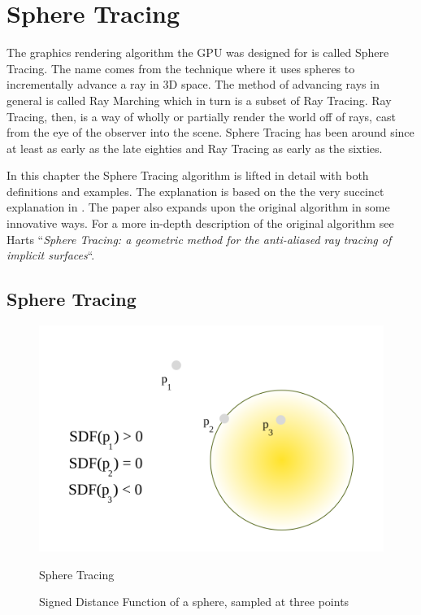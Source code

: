 \chapter{Sphere Tracing} \label{spheretracing}

	The graphics rendering algorithm the GPU was designed for is called
	Sphere Tracing\cite{Hart1996}. The name comes from the technique where it
	uses spheres to incrementally advance a ray in 3D space. The method of
	advancing rays in general is called Ray Marching which in turn is a subset of
	Ray Tracing\cite{Whitted1980a}. Ray Tracing, then, is a way of wholly or
	partially render the world off of rays, cast from the eye of the observer
	into the scene. Sphere Tracing has been around since at least as early as the
	late eighties\cite{Hart1989} and Ray Tracing as early as the
	sixties\cite{Appel1968}.

	In this chapter the Sphere Tracing algorithm is lifted in detail with
	both definitions and examples. The explanation is based on the the very
	succinct explanation in \cite{Korndorfer2014}. The paper also expands upon
	the original algorithm in some innovative ways. For a more in-depth
	description of the original algorithm see Harts ``\emph{Sphere Tracing: a
	geometric method for the anti-aliased ray tracing of implicit
	surfaces}``\cite{Hart1996}.

	\section{Sphere Tracing} 

		\begin{figure}
			\begin{flushright}
				\includegraphics[width=0.9\linewidth]{figure/SDF} 
			\end{flushright}
			\caption{ Signed Distance Function of a sphere, sampled at three points}
			\vspace{40pt}Sphere Tracing
		\end{figure}

